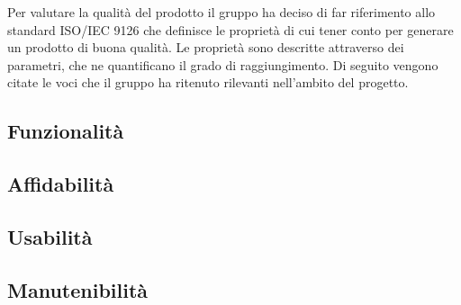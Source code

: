 Per valutare la qualità del prodotto il gruppo ha deciso di far riferimento allo standard ISO/IEC 9126\glo{}
che definisce le proprietà di cui tener conto per generare un prodotto di buona qualità. 
Le proprietà sono descritte attraverso dei parametri, che ne quantificano il grado di raggiungimento. 
Di seguito vengono citate le voci che il gruppo ha ritenuto rilevanti nell’ambito del progetto.

\subsection{Funzionalità}


\subsection{Affidabilità}


\subsection{Usabilità}


\subsection{Manutenibilità}
